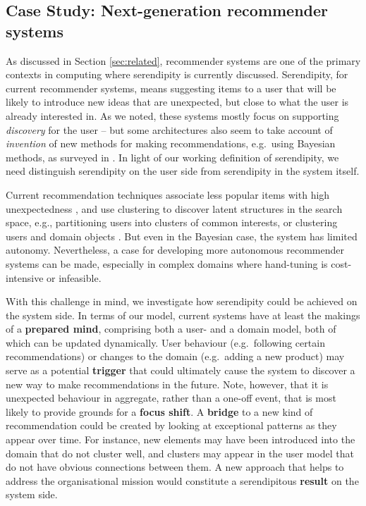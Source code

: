 \subsection{Case Study: Next-generation recommender systems} \label{sec:nextgenrec}
As discussed in Section \ref{sec:related}, recommender systems are one
of the primary contexts in computing where serendipity is currently discussed.  Serendipity, for current recommender systems, means suggesting items to a user that will be likely to introduce new ideas that are unexpected, but close to what the user is already interested in.  As we noted, these systems mostly focus on supporting \emph{discovery} for the user -- but some architectures also seem to take account of \emph{invention} of new methods for making recommendations, e.g.~using Bayesian methods, as surveyed in .  In light of our working definition of serendipity, we need distinguish serendipity on the user side from serendipity in the system itself.

Current recommendation techniques associate less popular items with high unexpectedness \cite{Herlocker2004,Lu2012}, and use clustering to discover latent structures in the search space, e.g., partitioning users into clusters of common interests, or clustering users and domain objects \cite{Kamahara2005,Onuma2009,Zhang2011}.  But even in the Bayesian case, the system has limited autonomy.  Nevertheless, a case for developing more autonomous recommender systems can be made, especially in complex domains where hand-tuning is cost-intensive or infeasible.

With this challenge in mind, we investigate how serendipity could be achieved on the system side. In terms of our model, current systems have at least the makings of a \textbf{prepared mind}, comprising both a user- and a domain model, both of which can be updated dynamically.  User behaviour (e.g.~following certain recommendations) or changes to the domain (e.g.~adding a new product) may serve as a potential \textbf{trigger} that could ultimately cause the system to discover a new way to make recommendations in the future.  Note, however, that it is unexpected behaviour in aggregate, rather than a one-off event, that is most likely to provide grounds for a \textbf{focus shift}.   A \textbf{bridge} to a new kind of recommendation could be created by looking at exceptional patterns as they appear over time.  For instance, new elements may have been introduced into the domain that do not cluster well, and clusters may appear in the user model that do not have obvious connections between them.  A new approach that helps to address the organisational mission would constitute a serendipitous \textbf{result} on the system side.

